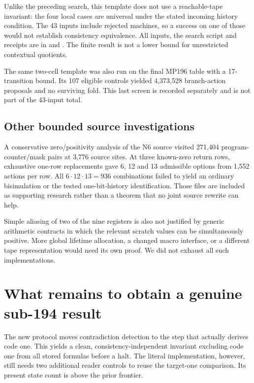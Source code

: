 \documentclass[11pt,letterpaper]{article}
\begin{document}
Unlike the preceding search, this template does not use a reachable-tape
invariant: the four local cases are universal under the stated incoming
history condition. The 43 inputs include rejected machines, so a success
on one of those would not establish consistency equivalence. All inputs,
the search script and receipts are in  and
. The finite result is not a lower
bound for unrestricted contextual quotients.

The same two-cell template was also run on the final MP196 table with
a 17-transition bound. Its 107 eligible controls yielded 4,373,528
branch-action proposals and no surviving fold. This last screen is
recorded separately and is not part of the 43-input total.

\subsection{Other bounded source investigations}

A conservative zero/positivity analysis of the N6 source visited 271,404
program-counter/mask pairs at 3,776 source sites. At three known-zero
return rows, exhaustive one-row replacements gave 6, 12 and 13 admissible
options from 1,552 actions per row. All $6\cdot12\cdot13=936$ combinations
failed to yield an ordinary bisimulation or the tested one-bit-history
identification. Those files are included as supporting research rather
than a theorem that no joint source rewrite can help.

Simple aliasing of two of the nine registers is also not justified by
generic arithmetic contracts in which the relevant scratch values can
be simultaneously positive. More global lifetime allocation, a changed
macro interface, or a different tape representation would need its own
proof. We did not exhaust all such implementations.

\section{What remains to obtain a genuine sub-194 result}

The new protocol moves contradiction detection to the step that actually
derives code one. This yields a clean, consistency-independent invariant
excluding code one from all stored formulas before a halt. The literal
implementation, however, still needs two additional reader controls to
reuse the target-one comparison. Its present state count is above the prior frontier.
\end{document}
